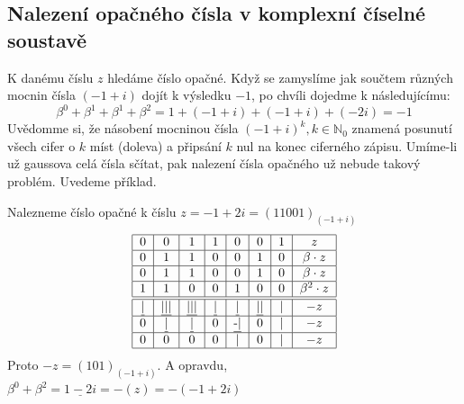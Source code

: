 \documentclass[czech,bachelor,dept470,male]{diploma}
\begin{document}
\subsection{Nalezení opačného čísla v komplexní číselné soustavě}

K danému číslu $z$ hledáme číslo opačné. Když se zamyslíme jak součtem různých mocnin čísla $(-1+i)$ dojít k výsledku $-1$, po chvíli dojedme k následujícímu:
$$\beta^0+\beta^1+\beta^1+\beta^2=1+(-1+i)+(-1+i)+(-2i)=-1$$
Uvědomme si, že násobení mocninou čísla $(-1+i)^k, k\in\mathbb{N}_0$ znamená posunutí všech cifer o $k$ míst (doleva) a připsání $k$ nul na konec ciferného zápisu. Umíme-li už gaussova celá čísla sčítat, pak nalezení čísla opačného už nebude takový problém. Uvedeme příklad.
\begin{example}
	Nalezneme číslo opačné k číslu $z = -1+2i = (11001)_{(-1+i)}$
	\begin{equation}\label{KompSoucA}
		\begin{tabular}{|c|c|c|c|c|c|c|c|}
			\hline
			0             & 0               & 1               & 1             & 0              & 0              & 1 & $z$              \\ \hline
			0             & 1               & 1               & 0             & 0              & 1              & 0 & $\beta\cdot z$   \\ \hline
			0             & 1               & 1               & 0             & 0              & 1              & 0 & $\beta\cdot z$   \\ \hline
			1             & 1               & 0               & 0             & 1              & 0              & 0 & $\beta^2\cdot z$ \\ \hline \hline
			\underline{|} & \underline{|||} & \underline{|||} & \underline{|} & \underline{|}  & \underline{||} & | & $-z$             \\\hline
			0             & \underline{|}   & \underline{|}   & 0             & \underline{-|} & 0              & | & $-z$             \\
			\hline
			0             & 0               & 0               & 0             & |              & 0              & | & $-z$             \\
			\hline
		\end{tabular}
	\end{equation}
	Proto $-z = (101)_{(-1+i)}$. A opravdu, $\beta^0 + \beta^2 = \underline{1-2i} = -(z)=-(-1+2i)$
\end{example}
\end{document}
